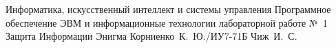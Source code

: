 \documentclass{bmstu}
\begin{document}
\makereporttitle
    {Информатика, искусственный интеллект и системы управления} %
    {Программное обеспечение ЭВМ и информационные технологии} %
    {лабораторной работе №~1} %
    {Защита Информации} %
    {Энигма} %
    {} %
    {Корниенко~К.~Ю./ИУ7-71Б} %
    {Чиж~И.~С.} %

\maketableofcontents






\makebibliography
\end{document}

